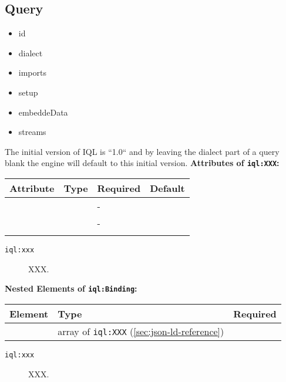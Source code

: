 \documentclass[11pt]{article}
\newcommand{\iqlns}{iql:}
\newcommand{\iqlType}[1]{\texttt{\iqlns#1}}
\newcommand{\attributes}[1]{\noindent\textbf{Attributes of \iqlType{#1}:}\newline\medskip}
\newcommand{\elements}[1]{\noindent\textbf{Nested Elements of \iqlType{#1}:}\newline\medskip}
\begin{document}
\subsection{Query}
\label{sec:json-ld-query}
\begin{itemize}
\item id
\item dialect
\item imports
\item setup
\item embeddeData
\item streams
\end{itemize}

The initial version of IQL is ``1.0`` and by leaving the dialect part of a query blank the engine will default to this initial version.
\attributes{XXX}
\begin{tabular}{|p{}|p{}|p{}|p{}|}
	\hline
	\textbf{Attribute} & \textbf{Type} & \textbf{Required} & \textbf{Default} \\ 
	\hline
	\hline
	&  & - &  \\ 
	\hline 
	&  & - &  \\ 
	\hline 
	&  &  & \\ 
	\hline 
\end{tabular}
\begin{description}
	\item[\iqlType{xxx}] XXX.
\end{description}
\elements{Binding}
\begin{tabular}{|p{}|p{}|p{}|}
	\hline
	\textbf{Element} & \textbf{Type} & \textbf{Required} \\ 
	\hline
	\hline 
	& array of \iqlType{XXX} (\ref{sec:json-ld-reference}) &  \\ 
	\hline 
\end{tabular}
\begin{description}
	\item[\iqlType{xxx}] XXX.
\end{description}

\end{document}
